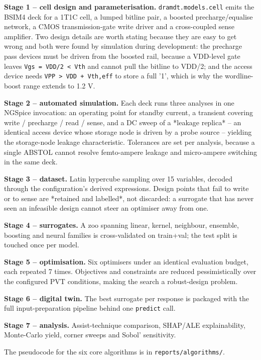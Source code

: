 \documentclass[conference]{IEEEtran}
\begin{document}
\textbf{Stage 1 -- cell design and parameterisation.} \texttt{dramdt.models.cell} emits the
BSIM4 deck for a 1T1C cell, a lumped bitline pair, a boosted precharge/equalise
network, a CMOS transmission-gate write driver and a cross-coupled sense
amplifier. Two design details are worth stating because they are easy to get
wrong and both were found by simulation during development: the precharge pass
devices must be driven from the boosted rail, because a VDD-level gate leaves
\texttt{Vgs = VDD/2 < Vth} and cannot pull the bitline to VDD/2; and the access device
needs \texttt{VPP > VDD + Vth,eff} to store a full '1', which is why the wordline-boost
range extends to 1.2 V.

\textbf{Stage 2 -- automated simulation.} Each deck runs three analyses in one NGSpice
invocation: an operating point for standby current, a transient covering
write / precharge / read / sense, and a DC sweep of a *leakage replica* -- an
identical access device whose storage node is driven by a probe source -- yielding
the storage-node leakage characteristic. Tolerances are set per analysis, because a
single ABSTOL cannot resolve femto-ampere leakage and micro-ampere switching in the
same deck.

\textbf{Stage 3 -- dataset.} Latin hypercube sampling over
15 variables, decoded through the configuration's derived
expressions. Design points that fail to write or to sense are *retained and
labelled*, not discarded: a surrogate that has never seen an infeasible design
cannot steer an optimiser away from one.

\textbf{Stage 4 -- surrogates.} A zoo spanning linear, kernel, neighbour, ensemble,
boosting and neural families is cross-validated on train+val; the test split is
touched once per model.

\textbf{Stage 5 -- optimisation.} Six optimisers under an identical evaluation budget,
each repeated 7 times. Objectives and
constraints are reduced pessimistically over the configured PVT conditions, making
the search a robust-design problem.

\textbf{Stage 6 -- digital twin.} The best surrogate per response is packaged with the
full input-preparation pipeline behind one \texttt{predict} call.

\textbf{Stage 7 -- analysis.} Assist-technique comparison, SHAP/ALE explainability,
Monte-Carlo yield, corner sweeps and Sobol' sensitivity.

The pseudocode for the six core algorithms is in \texttt{reports/algorithms/}.
\end{document}
